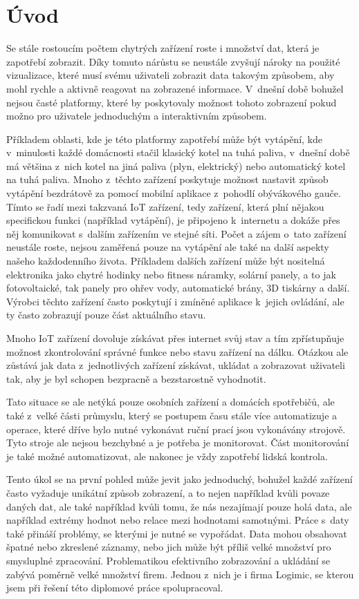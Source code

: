 \chapter{Úvod}
Se stále rostoucím počtem chytrých zařízení roste i množství dat, která je zapotřebí zobrazit. Díky tomuto nárůstu se neustále zvyšují nároky na použité vizualizace, které musí svému uživateli zobrazit data takovým způsobem, aby mohl rychle a aktivně reagovat na zobrazené informace. V~dnešní době bohužel nejsou časté platformy, které by poskytovaly možnost tohoto zobrazení pokud možno pro uživatele jednoduchým a interaktivním způsobem.

Příkladem oblasti, kde je této platformy zapotřebí může být vytápění, kde v~minulosti každé domácnosti stačil klasický kotel na tuhá paliva, v~dnešní době má většina z~nich kotel na jiná paliva (plyn, elektrický) nebo automatický kotel na tuhá paliva. Mnoho z~těchto zařízení poskytuje možnost nastavit způsob vytápění bezdrátově za pomocí mobilní aplikace z~pohodlí obývákového gauče. Tímto se řadí mezi takzvaná IoT zařízení, tedy zařízení, která plní nějakou specifickou funkci (například vytápění), je připojeno k~internetu a dokáže přes něj komunikovat s~dalším zařízením ve stejné síti. Počet a zájem o~tato zařízení neustále roste, nejsou zaměřená pouze na vytápění ale také na další aspekty našeho každodenního života. Příkladem dalších zařízení může být nositelná elektronika jako chytré hodinky nebo fitness náramky, solární panely, a to jak fotovoltaické, tak panely pro ohřev vody, automatické brány, 3D tiskárny a další. Výrobci těchto zařízení často poskytují i zmíněné aplikace k~jejich ovládání, ale ty často zobrazují pouze část aktuálního stavu.

Mnoho IoT zařízení dovoluje získávat přes internet svůj stav a tím zpřístupňuje možnost zkontrolování správné funkce nebo stavu zařízení na dálku. Otázkou ale zůstává jak data z~jednotlivých zařízení získávat, ukládat a zobrazovat uživateli tak, aby je byl schopen bezpracně a bezstarostně vyhodnotit.

Tato situace se ale netýká pouze osobních zařízení a domácích spotřebičů, ale také z~velké části průmyslu, který se postupem času stále více automatizuje a operace, které dříve bylo nutné vykonávat ruční prací jsou vykonávány strojově. Tyto stroje ale nejsou bezchybné a je potřeba je monitorovat. Část monitorování je také možné automatizovat, ale nakonec je vždy zapotřebí lidská kontrola. 

Tento úkol se na první pohled může jevit jako jednoduchý, bohužel každé zařízení často vyžaduje unikátní způsob zobrazení, a to nejen například kvůli povaze daných dat, ale také například kvůli tomu, že nás nezajímají pouze holá data, ale například extrémy hodnot nebo relace mezi hodnotami samotnými. Práce s~daty také přináší problémy, se kterými je nutné se vypořádat. Data mohou obsahovat špatné nebo zkreslené záznamy, nebo jich může být příliš velké množství pro smysluplné zpracování. Problematikou efektivního zobrazování a ukládání se zabývá poměrně velké množství firem. Jednou z~nich je i firma Logimic, se kterou jsem při řešení této diplomové práce spolupracoval.

